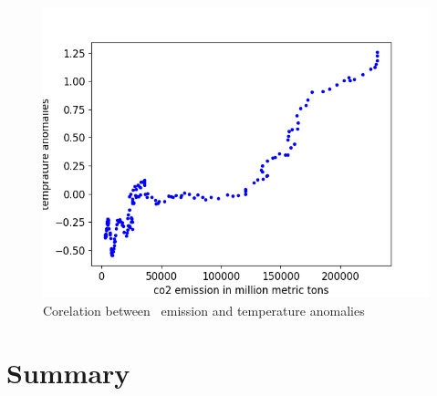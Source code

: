 \begin{figure}[h]
  \includegraphics[width=\linewidth]{img/co2-temperature-corelation.png}
  \caption{Corelation between \coo\ emission and temperature anomalies}
  \label{fig:co2-temperature-corelation}
\end{figure}

\section{Summary}
